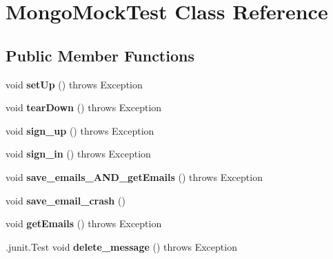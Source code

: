\hypertarget{class_mongo_mock_test}{}\section{Mongo\+Mock\+Test Class Reference}
\label{class_mongo_mock_test}
\subsection*{Public Member Functions}
\begin{DoxyCompactItemize}
\item 
\mbox{\label{class_mongo_mock_test_a7d8d32f12e18523d0bb89e755d134171}} 
void {\bfseries set\+Up} ()  throws Exception 
\item 
\mbox{\label{class_mongo_mock_test_a28fbdcd7b85df8a36a76f6f34f7d26ff}} 
void {\bfseries tear\+Down} ()  throws Exception 
\item 
\mbox{\label{class_mongo_mock_test_ae395f9cc023504f7f0996b5fc278f005}} 
void {\bfseries sign\+\_\+up} ()  throws Exception 
\item 
\mbox{\label{class_mongo_mock_test_a15c27b310fb86770380852519d291126}} 
void {\bfseries sign\+\_\+in} ()  throws Exception 
\item 
\mbox{\label{class_mongo_mock_test_adef69cb93c4c4879c5f058186e9fce59}} 
void {\bfseries save\+\_\+emails\+\_\+\+A\+N\+D\+\_\+get\+Emails} ()  throws Exception 
\item 
\mbox{\label{class_mongo_mock_test_ac22a05fc11731395677abadb55ab7f9e}} 
void {\bfseries save\+\_\+email\+\_\+crash} ()
\item 
\mbox{\label{class_mongo_mock_test_a2da72cc000c80b5809c0e1baf5a50f9b}} 
void {\bfseries get\+Emails} ()  throws Exception 
\item 
\mbox{\label{class_mongo_mock_test_a17b254b1b83791bbe1ba7bc5091d2926}} 
.junit.\+Test void {\bfseries delete\+\_\+message} ()  throws Exception 
\end{DoxyCompactItemize}
